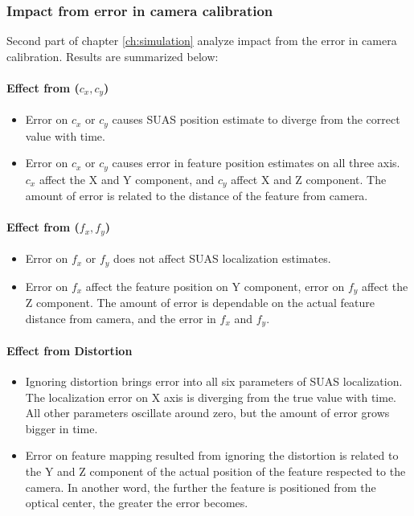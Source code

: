 \subsubsection{Impact from error in camera calibration} 
Second part of chapter \ref{ch:simulation} analyze impact from the error in camera calibration. Results are summarized below:

\paragraph{Effect from ($c_x, c_y$)}
\begin{itemize}
  \item Error on $c_x$ or $c_y$ causes SUAS position estimate to diverge from the correct value with time.
  \item Error on $c_x$ or $c_y$ causes error in feature position estimates on all three axis. $c_x$ affect the X and Y component, and $c_y$ affect X and Z component. The amount of error is related to the distance of the feature from camera.
\end{itemize}

\paragraph{Effect from ($f_x, f_y$)}
\begin{itemize}
  \item Error on $f_x$ or $f_y$ does not affect SUAS localization estimates.
  \item Error on $f_x$ affect the feature position on Y component, error on $f_y$ affect the Z component. The amount of error is dependable on the actual feature distance from camera, and the error in $f_x$ and $f_y$. 
\end{itemize}

\paragraph{Effect from Distortion}
\begin{itemize}
  \item Ignoring distortion brings error into all six parameters of SUAS localization. The localization error on X axis is diverging from the true value with time. All other parameters oscillate around zero, but the amount of error grows bigger in time. 
  \item Error on feature mapping resulted from ignoring the distortion is related to the Y and Z component of the actual position of the feature respected to the camera. In another word, the further the feature is positioned from the optical center, the greater the error becomes.
\end{itemize}


